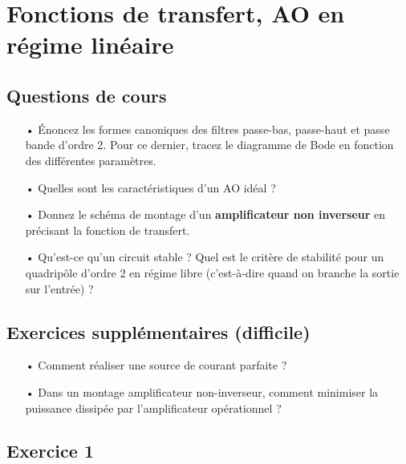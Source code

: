 \documentclass{report}
\begin{document}
\chapter{Fonctions de transfert, AO en régime linéaire}

\newpage

\section*{Questions de cours}
\begin{itemize}

	\item[•] Énoncez les formes canoniques des filtres passe-bas, passe-haut et passe bande d'ordre 2. Pour ce dernier, tracez le diagramme de Bode en fonction des différentes paramètres.
	
	\item[•] Quelles sont les caractéristiques d'un AO idéal ?

	\item[•] Donnez le schéma de montage d'un \textbf{amplificateur non inverseur} en précisant la fonction de transfert.
	
	\item[•] Qu'est-ce qu'un circuit stable ? Quel est le critère de stabilité pour un quadripôle d'ordre 2 en régime libre (c'est-à-dire quand on branche la sortie sur l'entrée) ?

\end{itemize}

\section*{Exercices supplémentaires (difficile)}

\begin{itemize}

	\item[•] Comment réaliser une source de courant parfaite ?
	
	\item[•] Dans un montage amplificateur non-inverseur, comment minimiser la puissance dissipée par l'amplificateur opérationnel ?

\end{itemize}

\newpage

\section*{Exercice 1}
 
\end{document}
